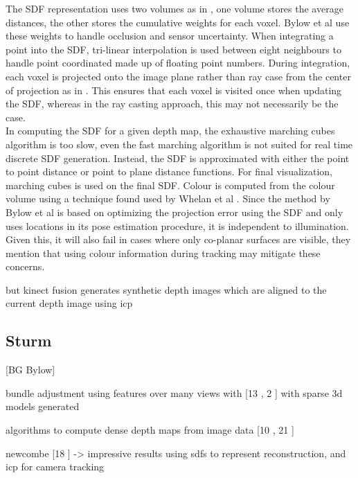 The SDF representation uses two volumes as in \cite{Curless96Volumetric}, one volume stores the average distances, the other stores the cumulative weights for each voxel. Bylow et al use these weights to handle occlusion and sensor uncertainty. When integrating a point into the SDF, tri-linear interpolation is used between eight neighbours to handle point coordinated made up of floating point numbers. During integration, each voxel is projected onto the image plane rather than ray case from the center of projection as in \cite{Newcombe11Kinectfusion}. This ensures that each voxel is visited once when updating the SDF, whereas in the ray casting approach, this may not necessarily be the case. \\

In computing the SDF for a given depth map, the exhaustive marching cubes algorithm is too slow, even the fast marching algorithm \cite{Baerentzen01Implementation} is not suited for real time discrete SDF generation. Instead, the SDF is approximated with either the point to point distance or point to plane distance functions. For final visualization, marching cubes is used \cite{Lorensen87Marching} on the final SDF. Colour is computed from the colour volume using a technique found used by Whelan et al \cite{Whelan13Robust}. Since the method by Bylow et al is based on optimizing the projection error using the SDF and only uses locations in its pose estimation procedure, it is independent to illumination. Given this, it will also fail in cases where only co-planar surfaces are visible, they mention that using colour information during tracking \cite{Kerl13Robust} may mitigate these concerns.


but kinect fusion generates synthetic depth images which are aligned to the current depth image using icp


\subsection{Sturm}




[BG Bylow]

bundle adjustment using features over many views with [13 \cite{Klein07Parallel} , 2 \cite{Agarwal09Building}] with sparse 3d models generated

algorithms to compute dense depth maps from image data [10 \cite{Hirschmuller05Accurate} , 21 \cite{Stuhmer10Real}]

newcombe [18 \cite{Newcombe11Kinectfusion} ] -> impressive results using sdfs to represent reconstruction, and icp for camera tracking

